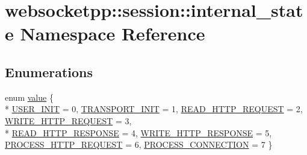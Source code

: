 \hypertarget{namespacewebsocketpp_1_1session_1_1internal__state}{}\section{websocketpp\+:\+:session\+:\+:internal\+\_\+state Namespace Reference}
\label{namespacewebsocketpp_1_1session_1_1internal__state}
\subsection*{Enumerations}
\begin{DoxyCompactItemize}
\item 
enum \hyperlink{namespacewebsocketpp_1_1session_1_1internal__state_a981c3a4fb8962bad264d7efea05c508d}{value} \{ \\*
\hyperlink{namespacewebsocketpp_1_1session_1_1internal__state_a981c3a4fb8962bad264d7efea05c508da3e18524ea63c814e1e5da6f12bf5af10}{U\+S\+E\+R\+\_\+\+I\+N\+I\+T} = 0, 
\hyperlink{namespacewebsocketpp_1_1session_1_1internal__state_a981c3a4fb8962bad264d7efea05c508dab874993580bfcc74626520e293659887}{T\+R\+A\+N\+S\+P\+O\+R\+T\+\_\+\+I\+N\+I\+T} = 1, 
\hyperlink{namespacewebsocketpp_1_1session_1_1internal__state_a981c3a4fb8962bad264d7efea05c508da9fc18535c4635e903c366639dad6c9ab}{R\+E\+A\+D\+\_\+\+H\+T\+T\+P\+\_\+\+R\+E\+Q\+U\+E\+S\+T} = 2, 
\hyperlink{namespacewebsocketpp_1_1session_1_1internal__state_a981c3a4fb8962bad264d7efea05c508da11b23897d538e9bb91558886b3ccea99}{W\+R\+I\+T\+E\+\_\+\+H\+T\+T\+P\+\_\+\+R\+E\+Q\+U\+E\+S\+T} = 3, 
\\*
\hyperlink{namespacewebsocketpp_1_1session_1_1internal__state_a981c3a4fb8962bad264d7efea05c508dac3e0dc06814a26a2cef1efd3cf8635d4}{R\+E\+A\+D\+\_\+\+H\+T\+T\+P\+\_\+\+R\+E\+S\+P\+O\+N\+S\+E} = 4, 
\hyperlink{namespacewebsocketpp_1_1session_1_1internal__state_a981c3a4fb8962bad264d7efea05c508da9a17ef24de50e25b3572df0ad11dc064}{W\+R\+I\+T\+E\+\_\+\+H\+T\+T\+P\+\_\+\+R\+E\+S\+P\+O\+N\+S\+E} = 5, 
\hyperlink{namespacewebsocketpp_1_1session_1_1internal__state_a981c3a4fb8962bad264d7efea05c508da2d82e414db0a6cbc60eb3cb4317b71e0}{P\+R\+O\+C\+E\+S\+S\+\_\+\+H\+T\+T\+P\+\_\+\+R\+E\+Q\+U\+E\+S\+T} = 6, 
\hyperlink{namespacewebsocketpp_1_1session_1_1internal__state_a981c3a4fb8962bad264d7efea05c508da20ef9274fcce8154c6cc28d00b900709}{P\+R\+O\+C\+E\+S\+S\+\_\+\+C\+O\+N\+N\+E\+C\+T\+I\+O\+N} = 7
 \}
\end{DoxyCompactItemize}


